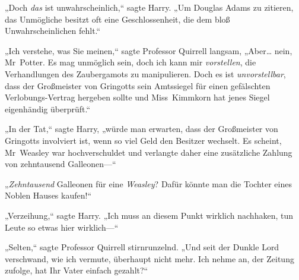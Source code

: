 „Doch \emph{das} ist unwahrscheinlich,“ sagte Harry. „Um Douglas Adams zu zitieren, das Unmögliche besitzt oft eine Geschlossenheit, die dem bloß Unwahrscheinlichen fehlt.“

„Ich verstehe, was Sie meinen,“ sagte Professor Quirrell langsam, „Aber… nein, Mr~Potter. Es mag unmöglich sein, doch ich kann mir \emph{vorstellen}, die Verhandlungen des Zaubergamots zu manipulieren. Doch es ist \emph{unvorstellbar}, dass der Großmeister von Gringotts sein Amtssiegel für einen gefälschten Verlobungs-Vertrag hergeben sollte und Miss~Kimmkorn hat jenes Siegel eigenhändig überprüft.“

„In der Tat,“ sagte Harry, „würde man erwarten, dass der Großmeister von Gringotts involviert ist, wenn so viel Geld den Besitzer wechselt. Es scheint, Mr~Weasley war hochverschuldet und verlangte daher eine zusätzliche Zahlung von zehntausend Galleonen—“

„\emph{Zehntausend} Galleonen für eine \emph{Weasley}? Dafür könnte man die Tochter eines Noblen Hauses kaufen!“

„Verzeihung,“ sagte Harry. „Ich muss an diesem Punkt wirklich nachhaken, tun Leute so etwas hier wirklich—“

„Selten,“ sagte Professor Quirrell stirnrunzelnd. „Und seit der Dunkle Lord verschwand, wie ich vermute, überhaupt nicht mehr. Ich nehme an, der Zeitung zufolge, hat Ihr Vater einfach gezahlt?“

